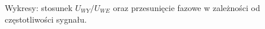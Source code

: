 \documentclass[14pt, table]{extarticle}
\begin{document}
\begin{figure}[H]
    \centering
    \qquad
\end{figure}

\begin{figure}[H]
    \centering
\end{figure}

\newpage
Wykresy: stosunek $U_{WY} / U_{WE}$ oraz przesunięcie fazowe w zależności od częstotliwości sygnału.
\end{document}
